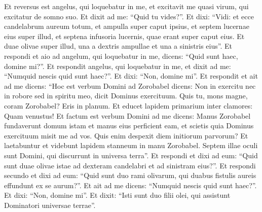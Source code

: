 \begin{biblechapter}  
\verse Et reversus est angelus, qui loquebatur in me, et excitavit me quasi virum, qui excitatur de somno suo. 
\verse Et dixit ad me: “Quid tu vides?”. Et dixi: “Vidi: et ecce candelabrum aureum totum, et ampulla super caput ipsius, et septem lucernae eius super illud, et septena infusoria lucernis, quae erant super caput eius. 
\verse Et duae olivae super illud, una a dextris ampullae et una a sinistris eius”. 
\verse Et respondi et aio ad angelum, qui loquebatur in me, dicens: “Quid sunt haec, domine mi?”. 
\verse Et respondit angelus, qui loquebatur in me, et dixit ad me: “Numquid nescis quid sunt haec?”. Et dixi: “Non, domine mi”. 
\verse Et respondit et ait ad me dicens: “Hoc est verbum Domini ad Zorobabel dicens: Non in exercitu nec in robore sed in spiritu meo, dicit Dominus exercituum.  
\verse Quis tu, mons magne, coram Zorobabel? Eris in planum. Et educet lapidem primarium inter clamores: Quam venustus! 
\verse Et factum est verbum Domini ad me dicens: 
\verse Manus Zorobabel fundaverunt domum istam et manus eius perficient eam, et scietis quia Dominus exercituum misit me ad vos. 
\verse Quis enim despexit diem initiorum parvorum? Et laetabuntur et videbunt lapidem stanneum in manu Zorobabel. Septem illae oculi sunt Domini, qui discurrunt in universa terra”. 
\verse Et respondi et dixi ad eum: “Quid sunt duae olivae istae ad dexteram candelabri et ad sinistram eius?”. 
\verse Et respondi secundo et dixi ad eum: “Quid sunt duo rami olivarum, qui duabus fistulis aureis effundunt ex se aurum?”. 
\verse Et ait ad me dicens: “Numquid nescis quid sunt haec?”. Et dixi: “Non, domine mi”. 
\verse Et dixit: “Isti sunt duo filii olei, qui assistunt Dominatori universae terrae”. 
\end{biblechapter}

